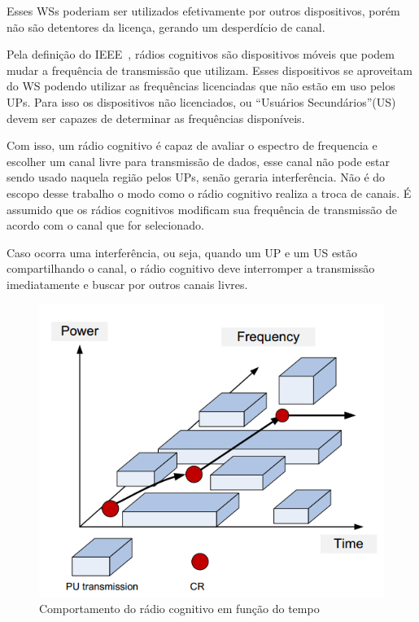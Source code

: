 Esses WSs poderiam ser utilizados efetivamente por outros dispositivos, porém não são detentores da licença, gerando um desperdício de canal.

Pela definição do IEEE~\cite{ieee80222}, rádios cognitivos são dispositivos móveis que podem mudar a frequência de transmissão que utilizam. Esses dispositivos se aproveitam do WS podendo utilizar as frequências licenciadas que não estão em uso pelos UPs. Para isso os dispositivos não licenciados, ou ``Usuários Secundários''(US)
devem ser capazes de determinar as frequências disponíveis.

Com isso, um rádio cognitivo é capaz de avaliar o espectro de frequencia e escolher um canal livre para transmissão de dados, esse canal não pode estar sendo usado naquela região pelos UPs, senão geraria interferência. Não é do escopo desse trabalho o modo como o rádio cognitivo realiza a troca de canais. É assumido que os rádios cognitivos modificam sua frequência de transmissão de acordo com o canal que for selecionado.

Caso ocorra uma interferência, ou seja, quando um UP e um US estão compartilhando o canal, o rádio cognitivo deve interromper a transmissão imediatamente e buscar por outros canais livres.

\begin{figure}[htb]
\centering
\includegraphics[width=1.0\textwidth]{figs/cr_functioning_over_time}
\caption[Comportamento do rádio cognitivo em função do tempo]
{Comportamento do rádio cognitivo em função do tempo}
\label{fig:funcionamentodoradiocognitivo}
\end{figure} 

